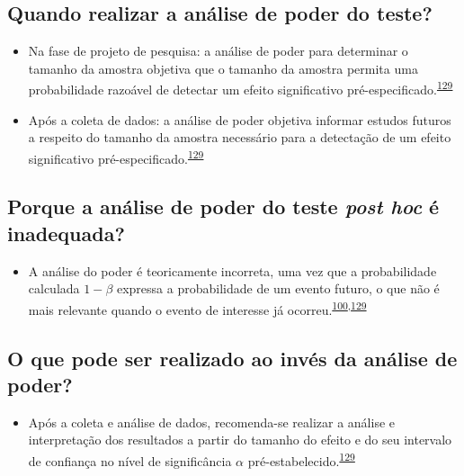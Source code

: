 \documentclass[
  a4paper,
]{book}
\providecommand{\tightlist}{%
  \setlength{\itemsep}{0pt}\setlength{\parskip}{0pt}}
\begin{document}
\hypertarget{quando-realizar-a-anuxe1lise-de-poder-do-teste}{%
\subsection{Quando realizar a análise de poder do teste?}\label{quando-realizar-a-anuxe1lise-de-poder-do-teste}}

\begin{itemize}
\item
  Na fase de projeto de pesquisa: a análise de poder para determinar o tamanho da amostra objetiva que o tamanho da amostra permita uma probabilidade razoável de detectar um efeito significativo pré-especificado.\textsuperscript{\protect\hyperlink{ref-heckman2022}{129}}
\item
  Após a coleta de dados: a análise de poder objetiva informar estudos futuros a respeito do tamanho da amostra necessário para a detectação de um efeito significativo pré-especificado.\textsuperscript{\protect\hyperlink{ref-heckman2022}{129}}
\end{itemize}

\hypertarget{porque-a-anuxe1lise-de-poder-do-teste-post-hoc-uxe9-inadequada}{%
\subsection{\texorpdfstring{Porque a análise de poder do teste \emph{post hoc} é inadequada?}{Porque a análise de poder do teste post hoc é inadequada?}}\label{porque-a-anuxe1lise-de-poder-do-teste-post-hoc-uxe9-inadequada}}

\begin{itemize}
\tightlist
\item
  A análise do poder é teoricamente incorreta, uma vez que a probabilidade calculada \(1-\beta\) expressa a probabilidade de um evento futuro, o que não é mais relevante quando o evento de interesse já ocorreu.\textsuperscript{\protect\hyperlink{ref-Cummings2003}{100},\protect\hyperlink{ref-heckman2022}{129}}
\end{itemize}

\hypertarget{o-que-pode-ser-realizado-ao-invuxe9s-da-anuxe1lise-de-poder}{%
\subsection{O que pode ser realizado ao invés da análise de poder?}\label{o-que-pode-ser-realizado-ao-invuxe9s-da-anuxe1lise-de-poder}}

\begin{itemize}
\tightlist
\item
  Após a coleta e análise de dados, recomenda-se realizar a análise e interpretação dos resultados a partir do tamanho do efeito e do seu intervalo de confiança no nível de significância \(\alpha\) pré-estabelecido.\textsuperscript{\protect\hyperlink{ref-heckman2022}{129}}
\end{itemize}
\end{document}
